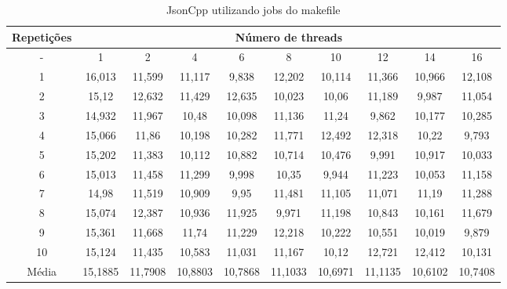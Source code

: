 \begin{table}[h]
\centering
\caption{JsonCpp utilizando jobs do makefile}
\label{tab:jsoncpp}
\begin{tiny}
\begin{tabular}{cccccccccc}
\toprule
\textbf{Repetições} & \multicolumn{9}{c}{\textbf{Número de threads}} \\ \midrule
- & 1 & 2 & 4 & 6 & 8 & 10 & 12 & 14 & 16 \\ 
1 & 16,013   & 11,599  & 11,117  & 9,838   & 12,202  & 10,114  & 11,366  & 10,966  & 12,108 \\
2 & 15,12    & 12,632  & 11,429  & 12,635  & 10,023  & 10,06   & 11,189  & 9,987   & 11,054 \\
3 & 14,932   & 11,967  & 10,48   & 10,098  & 11,136  & 11,24   & 9,862   & 10,177  & 10,285 \\
4 & 15,066   & 11,86   & 10,198  & 10,282  & 11,771  & 12,492  & 12,318  & 10,22   & 9,793 \\ 
5 & 15,202   & 11,383  & 10,112  & 10,882  & 10,714  & 10,476  & 9,991   & 10,917  & 10,033 \\
6 & 15,013   & 11,458  & 11,299  & 9,998   & 10,35   & 9,944   & 11,223  & 10,053  & 11,158 \\
7 & 14,98    & 11,519  & 10,909  & 9,95    & 11,481  & 11,105  & 11,071  & 11,19   & 11,288 \\
8 & 15,074   & 12,387  & 10,936  & 11,925  & 9,971   & 11,198  & 10,843  & 10,161  & 11,679 \\
9 & 15,361   & 11,668  & 11,74   & 11,229  & 12,218  & 10,222  & 10,551  & 10,019  & 9,879 \\ 
10 & 15,124   & 11,435  & 10,583  & 11,031  & 11,167  & 10,12   & 12,721  & 12,412  & 10,131 \\ \midrule
Média & 15,1885  & 11,7908 & 10,8803 & 10,7868 & 11,1033 & 10,6971 & 11,1135 & 10,6102 & 10,7408 \\ \bottomrule
\end{tabular}
\end{tiny}
\end{table}

